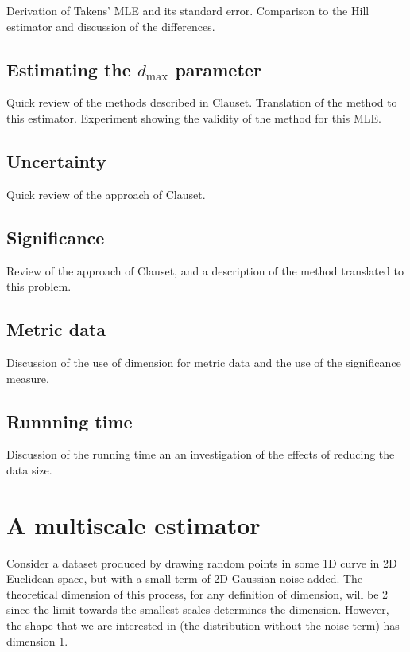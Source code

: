 \documentclass[10pt]{article}
\begin{document}
Derivation of Takens' MLE and its standard error. Comparison to the Hill estimator and discussion of the differences.
 
\subsection{Estimating the $d_{\max}$ parameter}

Quick review of the methods described in Clauset. Translation of the method to this estimator. Experiment showing the validity of the method for this MLE.

\subsection{Uncertainty}

Quick review of the approach of Clauset.

\subsection{Significance}

Review of the approach of Clauset, and a description of the method translated to this problem.

\subsection{Metric data}

Discussion of the use of dimension for metric data and the use of the significance measure.

\subsection{Runnning time}

Discussion of the running time an an investigation of the effects of reducing the data size.

\section{A multiscale estimator}

Consider a dataset produced by drawing random points in some 1D curve in 2D Euclidean space, but with a small term of 2D Gaussian noise added. The theoretical dimension of this process, for any definition of dimension, will be 2 since the limit towards the smallest scales determines the dimension. However, the shape that we are interested in (the distribution without the noise term) has dimension 1. 
\end{document}

